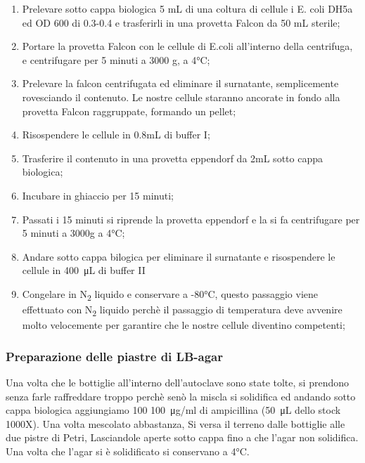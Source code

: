 \begin{enumerate}

	\item Prelevare sotto cappa biologica 5 mL di una coltura di cellule i E. coli DH5a ed OD 600 di 0.3-0.4 e trasferirli in una provetta Falcon da 50 mL sterile;

  \item Portare la provetta Falcon con le cellule di E.coli all'interno della centrifuga, e centrifugare per 5 minuti a 3000 g, a 4°C;

  \item Prelevare la falcon centrifugata ed eliminare il surnatante, semplicemente rovesciando il contenuto. Le nostre cellule staranno ancorate in fondo alla provetta Falcon raggruppate, formando un pellet;

  \item Risospendere le cellule in 0.8mL di buffer I;

  \item Trasferire il contenuto in una provetta eppendorf da 2mL sotto cappa biologica;

  \item Incubare in ghiaccio per 15 minuti;

  \item Passati i 15 minuti si riprende la provetta eppendorf e la si fa centrifugare per 5 minuti a 3000g a 4°C;

  \item Andare sotto cappa bilogica per eliminare il surnatante e risospendere le cellule in \SI{400}{\micro\liter} di buffer II

  \item Congelare in N\textsubscript2 liquido e conservare a -80°C, questo passaggio viene effettuato con N\textsubscript2 liquido perchè il passaggio di temperatura deve avvenire molto velocemente per garantire che le nostre cellule diventino competenti;

\end{enumerate}

\subsubsection{Preparazione delle piastre di LB-agar}

Una volta che le bottiglie all'interno dell'autoclave sono state tolte, si prendono senza farle raffreddare troppo perchè senò la miscla si solidifica ed andando sotto cappa biologica
aggiungiamo 100 \SI{100}{\micro\gram}/ml di ampicillina (\SI{50}{\micro\liter} dello stock 1000X). Una volta mescolato abbastanza, Si versa il terreno dalle bottiglie alle due pistre di Petri, Lasciandole
aperte sotto cappa fino a che l'agar non solidifica. Una volta che l'agar si è solidificato si conservano a 4°C.


